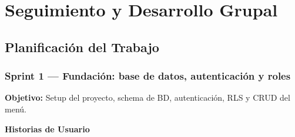 \chapter{Seguimiento y Desarrollo Grupal}

\section{Planificación del Trabajo}

\subsection*{Sprint 1 — Fundación: base de datos, autenticación y roles}

\textbf{Objetivo:}
Setup del proyecto, schema de BD, autenticación, RLS y CRUD del menú.

\textbf{Historias de Usuario}

